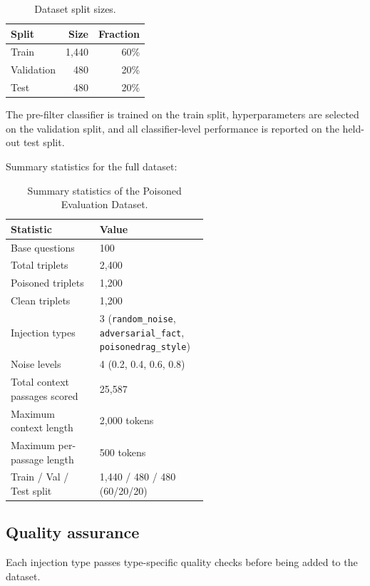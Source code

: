 \begin{table}[h]
\centering
\caption{Dataset split sizes.}
\label{tab:splits}
\begin{tabular}{lrr}
\toprule
\textbf{Split} & \textbf{Size} & \textbf{Fraction} \\
\midrule
Train & 1{,}440 & 60\% \\
Validation & 480 & 20\% \\
Test & 480 & 20\% \\
\bottomrule
\end{tabular}
\end{table}

The pre-filter classifier is trained on the train split, hyperparameters are selected on the validation split, and all classifier-level performance is reported on the held-out test split.

Summary statistics for the full dataset:

\begin{table}[htbp]
\centering
\caption{Summary statistics of the Poisoned Evaluation Dataset.}
\label{tab:dataset-stats}
\small
\begin{tabular}{lp{0.55\linewidth}}
\toprule
\textbf{Statistic} & \textbf{Value} \\
\midrule
Base questions & 100 \\
Total triplets & 2{,}400 \\
Poisoned triplets & 1{,}200 \\
Clean triplets & 1{,}200 \\
Injection types & 3 (\texttt{random\_noise}, \texttt{adversarial\_fact}, \texttt{poisonedrag\_style}) \\
Noise levels & 4 (0.2, 0.4, 0.6, 0.8) \\
Total context passages scored & 25{,}587 \\
Maximum context length & 2{,}000 tokens \\
Maximum per-passage length & 500 tokens \\
Train / Val / Test split & 1{,}440 / 480 / 480 (60/20/20) \\
\bottomrule
\end{tabular}
\end{table}

\subsection{Quality assurance}

Each injection type passes type-specific quality checks before being added to the dataset.

